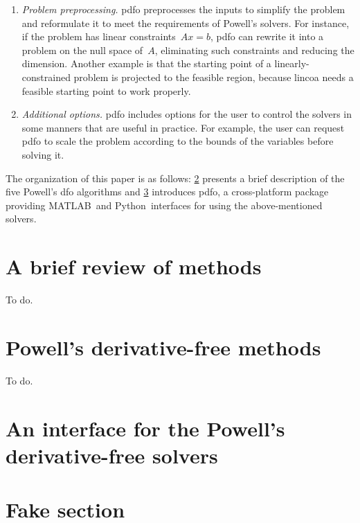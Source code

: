 \documentclass[11pt,draft]{article}
\def\matlab{\mbox{MATLAB\textsuperscript{\textregistered}}}
\def\python{\mbox{Python}}
\begin{document}
\begin{enumerate}
    \item \emph{Problem preprocessing.}
    \Gls{pdfo} preprocesses the inputs to simplify the problem and reformulate it to meet the requirements of Powell's solvers.
    For instance, if the problem has linear constraints~$A x = b$, \gls{pdfo} can rewrite it into a problem on the null space of~$A$, eliminating such constraints and reducing the dimension.
    Another example is that the starting point of a linearly-constrained problem is projected to the feasible region, because \gls{lincoa} needs a feasible starting point to work properly.

    \item \emph{Additional options.}
    \gls{pdfo} includes options for the user to control the solvers in some manners that are useful in practice.
    For example, the user can request \gls{pdfo} to scale the problem according to the bounds of the variables before solving it.

\end{enumerate}

The organization of this paper is as follows: \cref{sec:powell} presents a brief description of the five Powell's \gls{dfo} algorithms and \cref{sec:pdfo} introduces \gls{pdfo}, a cross-platform package providing \matlab\ and \python\ interfaces for using the above-mentioned solvers.

\section{A brief review of  methods}

To do.

\section{Powell's derivative-free methods}
\label{sec:powell}

To do.

\section{An interface for the Powell's derivative-free solvers}
\label{sec:pdfo}

\section{Fake section}
\label{sec:fake}

\printbibliography
\end{document}

